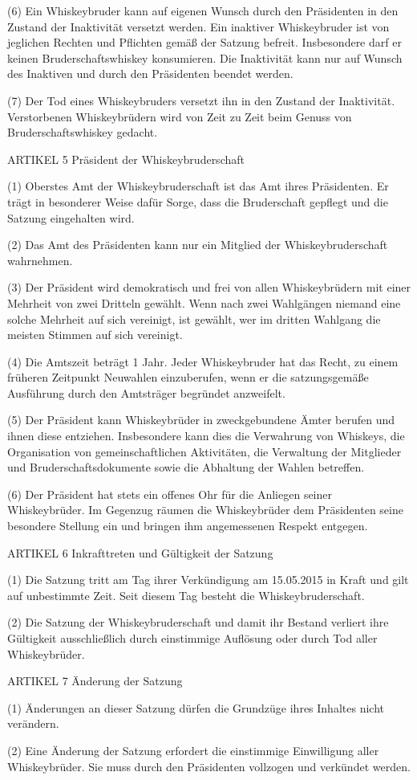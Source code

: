 (6) Ein Whiskeybruder kann auf eigenen Wunsch durch den Präsidenten in den Zustand der Inaktivität versetzt werden. Ein inaktiver Whiskeybruder ist von jeglichen Rechten und Pflichten gemäß der Satzung befreit. Insbesondere darf er keinen Bruderschaftswhiskey konsumieren. Die Inaktivität kann nur auf Wunsch des Inaktiven und durch den Präsidenten beendet werden.

(7) Der Tod eines Whiskeybruders versetzt ihn in den Zustand der Inaktivität. Verstorbenen Whiskeybrüdern wird von Zeit zu Zeit beim Genuss von Bruderschaftswhiskey gedacht.



    ARTIKEL 5
    Präsident der Whiskeybruderschaft

(1) Oberstes Amt der Whiskeybruderschaft ist das Amt ihres Präsidenten. Er trägt in besonderer Weise dafür Sorge, dass die Bruderschaft gepflegt und die Satzung eingehalten wird.

(2) Das Amt des Präsidenten kann nur ein Mitglied der Whiskeybruderschaft wahrnehmen.

(3) Der Präsident wird demokratisch und frei von allen Whiskeybrüdern mit einer Mehrheit von zwei Dritteln gewählt. Wenn nach zwei Wahlgängen niemand eine solche Mehrheit auf sich vereinigt, ist gewählt, wer im dritten Wahlgang die meisten Stimmen auf sich vereinigt.

(4) Die Amtszeit beträgt 1 Jahr. Jeder Whiskeybruder hat das Recht, zu einem früheren Zeitpunkt Neuwahlen einzuberufen, wenn er die satzungsgemäße Ausführung durch den Amtsträger begründet anzweifelt.

(5) Der Präsident kann Whiskeybrüder in zweckgebundene Ämter berufen und ihnen diese entziehen. Insbesondere kann dies die Verwahrung von Whiskeys, die Organisation von gemeinschaftlichen Aktivitäten, die Verwaltung der Mitglieder und Bruderschaftsdokumente sowie die Abhaltung der Wahlen betreffen.

(6) Der Präsident hat stets ein offenes Ohr für die Anliegen seiner Whiskeybrüder. Im Gegenzug räumen die Whiskeybrüder dem Präsidenten seine besondere Stellung ein und bringen ihm angemessenen Respekt entgegen.



    ARTIKEL 6
    Inkrafttreten und Gültigkeit der Satzung

(1) Die Satzung tritt am Tag ihrer Verkündigung am 15.05.2015 in Kraft und gilt auf unbestimmte Zeit. Seit diesem Tag besteht die Whiskeybruderschaft.

(2) Die Satzung der Whiskeybruderschaft und damit ihr Bestand verliert ihre Gültigkeit ausschließlich durch einstimmige Auflösung oder durch Tod aller Whiskeybrüder.



    ARTIKEL 7
    Änderung der Satzung

(1) Änderungen an dieser Satzung dürfen die Grundzüge ihres Inhaltes nicht verändern.

(2) Eine Änderung der Satzung erfordert die einstimmige Einwilligung aller Whiskeybrüder. Sie muss durch den Präsidenten vollzogen und verkündet werden.



